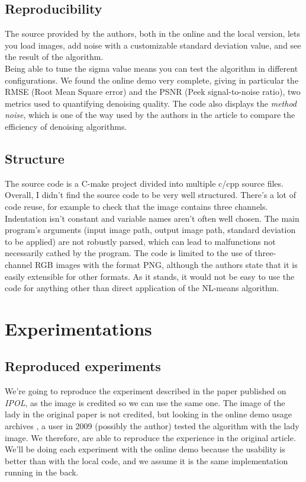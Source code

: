 \documentclass[a4paper, twocolumn, twoside]{article}
\begin{document}
\subsection{Reproducibility}
The source provided by the authors, both in the online and the local version,
lets you load images, add noise with a customizable standard deviation value,
and see the result of the algorithm.\\
Being able to tune the sigma value means you can test the algorithm in different configurations.
We found the online demo very complete, giving in particular the RMSE (Root Mean Square error)
and the PSNR (Peek signal-to-noise ratio), two metrics used to quantifying denoising quality.
The code also displays the \textit{method noise},
which is one of the way used by the authors in the article to compare the efficiency of denoising algorithms.
\subsection{Structure}
The source code is a C-make project divided into multiple c/cpp source files.
Overall, I didn't find the source code to be very well structured.
There's a lot of code reuse, for example to check that the image contains three
channels. Indentation isn't constant and variable names aren't often
well chosen.
The main program's arguments (input image path, output image path, standard deviation to be applied)
are not robustly parsed, which can lead to malfunctions not necessarily cathed by the program.
The code is limited to the use of three-channel RGB images with the format PNG,
although the authors state that it is easily extensible for other formats.
As it stands, it would not be easy to use the code for anything other 
than direct application of the NL-means algorithm.
\section{Experimentations}
\subsection{Reproduced experiments}
We're going to reproduce the experiment described in the paper published on \textit{IPOL},
as the image is credited so we can use the same one.
The image of the lady in the original paper is not credited,
but looking in the online demo usage archives \cite{ipolarchive},
a user in 2009 (possibly the author) tested the algorithm with the lady image.
We therefore, are able to reproduce the experience in the original article.
We'll be doing each experiment with the online demo because the usability is better than with
the local code, and we assume it is the same implementation running in the back.
\end{document}
